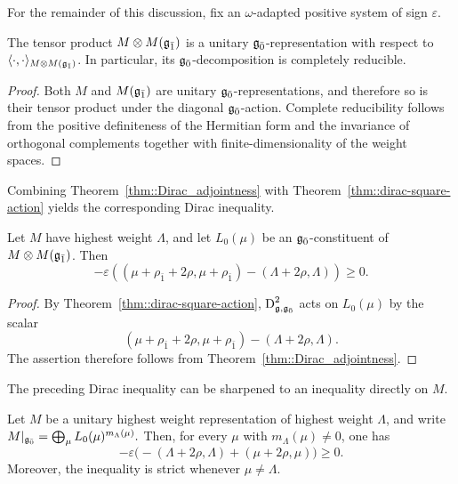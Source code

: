 For the remainder of this discussion, fix an $\omega$-adapted positive
system of sign $\varepsilon$.

\begin{proposition}\label{prop::tensor_product_unitary_even}
 The tensor product $M\otimes M({\mathfrak{g}_{\bar{1}}})$ is a unitary ${\mathfrak{g}_{\bar{0}}}$-representation with
 respect to $\langle\cdot,\cdot\rangle_{M\otimes M({\mathfrak{g}_{\bar{1}}})}$. In
 particular, its ${\mathfrak{g}_{\bar{0}}}$-decomposition is completely reducible.
\end{proposition}

\begin{proof}
 Both $M$ and $M({\mathfrak{g}_{\bar{1}}})$ are unitary ${\mathfrak{g}_{\bar{0}}}$-representations, and therefore so is
 their tensor product under the diagonal ${\mathfrak{g}_{\bar{0}}}$-action. Complete
 reducibility follows from the positive definiteness of the Hermitian
 form and the invariance of orthogonal complements together with finite-dimensionality of the weight spaces.
\end{proof}

Combining Theorem~\ref{thm::Dirac_adjointness} with
Theorem~\ref{thm::dirac-square-action} yields the corresponding Dirac
inequality.

\begin{proposition}\label{prop::Dirac_inequality_adapted}
 Let $M$ have highest weight $\Lambda$, and let $L_{0}(\mu)$ be an
 ${\mathfrak{g}_{\bar{0}}}$-constituent of $M\otimes M({\mathfrak{g}_{\bar{1}}})$. Then
 \[
  -\varepsilon
  \left(
  (\mu+\rho_{\bar1}+2\rho,\mu+\rho_{\bar1})
  -
  (\Lambda+2\rho,\Lambda)
  \right)
  \geq0.
 \]
\end{proposition}

\begin{proof}
 By Theorem~\ref{thm::dirac-square-action},
 $\operatorname{D}_{{\mathfrak{g}},{\mathfrak{g}_{\bar{0}}}}^{2}$ acts on $L_{0}(\mu)$ by the scalar
 \[
  (\mu+\rho_{\bar1}+2\rho,\mu+\rho_{\bar1})
  -
  (\Lambda+2\rho,\Lambda).
 \]
 The assertion therefore follows from Theorem~\ref{thm::Dirac_adjointness}.
\end{proof}

The preceding Dirac inequality can be sharpened to an inequality directly on $M$.

\begin{corollary}\label{cor::Dirac_inequality_on_M}
 Let $M$ be a unitary highest weight representation of highest weight
 $\Lambda$, and write
 $
 M\vert_{{\mathfrak{g}_{\bar{0}}}}
 =
 \bigoplus_{\mu}L_{0}(\mu)^{m_{\Lambda}(\mu)}.
 $
 Then, for every $\mu$ with $m_{\Lambda}(\mu)\neq0$, one has
 \[
 -\varepsilon
 \bigl(
 -(\Lambda+2\rho,\Lambda)
 +(\mu+2\rho,\mu)
 \bigr)
 \geq0.
 \]
 Moreover, the inequality is strict whenever $\mu\neq\Lambda$.
\end{corollary}

